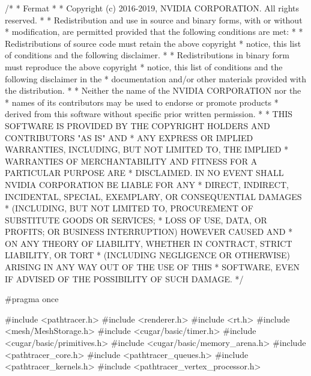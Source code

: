 
\begin{DoxyCodeInclude}
\textcolor{comment}{/*}
\textcolor{comment}{ * Fermat}
\textcolor{comment}{ *}
\textcolor{comment}{ * Copyright (c) 2016-2019, NVIDIA CORPORATION. All rights reserved.}
\textcolor{comment}{ * }
\textcolor{comment}{ * Redistribution and use in source and binary forms, with or without}
\textcolor{comment}{ * modification, are permitted provided that the following conditions are met:}
\textcolor{comment}{ *    * Redistributions of source code must retain the above copyright}
\textcolor{comment}{ *      notice, this list of conditions and the following disclaimer.}
\textcolor{comment}{ *    * Redistributions in binary form must reproduce the above copyright}
\textcolor{comment}{ *      notice, this list of conditions and the following disclaimer in the}
\textcolor{comment}{ *      documentation and/or other materials provided with the distribution.}
\textcolor{comment}{ *    * Neither the name of the NVIDIA CORPORATION nor the}
\textcolor{comment}{ *      names of its contributors may be used to endorse or promote products}
\textcolor{comment}{ *      derived from this software without specific prior written permission.}
\textcolor{comment}{ * }
\textcolor{comment}{ * THIS SOFTWARE IS PROVIDED BY THE COPYRIGHT HOLDERS AND CONTRIBUTORS "AS IS" AND}
\textcolor{comment}{ * ANY EXPRESS OR IMPLIED WARRANTIES, INCLUDING, BUT NOT LIMITED TO, THE IMPLIED}
\textcolor{comment}{ * WARRANTIES OF MERCHANTABILITY AND FITNESS FOR A PARTICULAR PURPOSE ARE}
\textcolor{comment}{ * DISCLAIMED. IN NO EVENT SHALL NVIDIA CORPORATION BE LIABLE FOR ANY}
\textcolor{comment}{ * DIRECT, INDIRECT, INCIDENTAL, SPECIAL, EXEMPLARY, OR CONSEQUENTIAL DAMAGES}
\textcolor{comment}{ * (INCLUDING, BUT NOT LIMITED TO, PROCUREMENT OF SUBSTITUTE GOODS OR SERVICES;}
\textcolor{comment}{ * LOSS OF USE, DATA, OR PROFITS; OR BUSINESS INTERRUPTION) HOWEVER CAUSED AND}
\textcolor{comment}{ * ON ANY THEORY OF LIABILITY, WHETHER IN CONTRACT, STRICT LIABILITY, OR TORT}
\textcolor{comment}{ * (INCLUDING NEGLIGENCE OR OTHERWISE) ARISING IN ANY WAY OUT OF THE USE OF THIS}
\textcolor{comment}{ * SOFTWARE, EVEN IF ADVISED OF THE POSSIBILITY OF SUCH DAMAGE.}
\textcolor{comment}{ */}

\textcolor{preprocessor}{#pragma once}

\textcolor{preprocessor}{#include <pathtracer.h>}
\textcolor{preprocessor}{#include <renderer.h>}
\textcolor{preprocessor}{#include <rt.h>}
\textcolor{preprocessor}{#include <mesh/MeshStorage.h>}
\textcolor{preprocessor}{#include <cugar/basic/timer.h>}
\textcolor{preprocessor}{#include <cugar/basic/primitives.h>}
\textcolor{preprocessor}{#include <cugar/basic/memory\_arena.h>}
\textcolor{preprocessor}{#include <pathtracer\_core.h>}
\textcolor{preprocessor}{#include <pathtracer\_queues.h>}
\textcolor{preprocessor}{#include <pathtracer\_kernels.h>}
\textcolor{preprocessor}{#include <pathtracer\_vertex\_processor.h>}


\end{DoxyCodeInclude}
